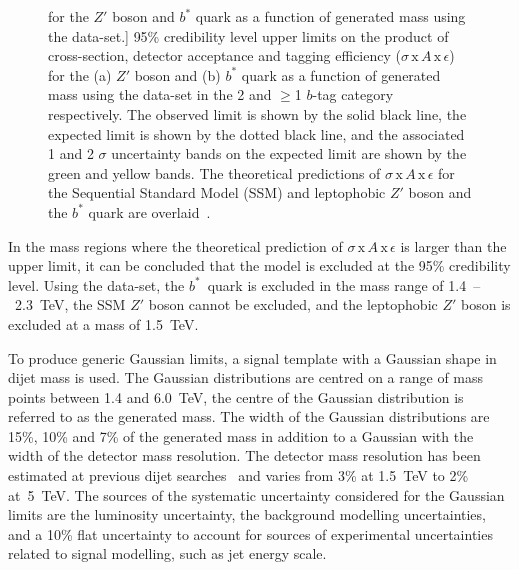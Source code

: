 \begin{figure}[!b]
        for the $Z'$ boson and $b^*$ quark as a function of generated mass
        using the \summer{} data-set.]
      {95\% credibility level upper limits on
        the product of cross-section, detector acceptance and tagging efficiency ($\sigma\,\text{x}\,\mathit{A}\,\text{x}\,\epsilon$)
        for the (a) $Z'$ boson and (b) $b^*$ quark  as a function of generated mass
        using the \summer{} data-set in the 2 and \mbox{$\geq$1} $b$-tag category respectively.
        The observed limit is shown by the solid black line,
        the expected limit is shown by the dotted black line,
        and the associated 1 and 2 $\sigma$ uncertainty bands on the expected limit are shown by the green and yellow bands.
        The theoretical predictions of $\sigma\,\text{x}\,\mathit{A}\,\text{x}\,\epsilon$
        for the Sequential Standard Model (SSM) and leptophobic $Z'$ boson and the $b^*$ quark are overlaid~\cite{dibjet-ichep_conf}.
      }
  \label{fig:lim-summer_benchmark}
\end{figure}

In the mass regions where the theoretical prediction of $\sigma\,\text{x}\,\mathit{A}\,\text{x}\,\epsilon$
is larger than the upper limit, it can be concluded that the model is excluded at the 95\% credibility level.
Using the \summer{} data-set,
the \mbox{$b^*$ quark} is excluded in the mass range of 1.4~--~2.3~TeV,
the SSM $Z'$ boson cannot be excluded,
and the leptophobic $Z'$ boson is excluded at a mass of 1.5~TeV.


\newpage 
To produce generic Gaussian limits,
a signal template with a Gaussian shape in dijet mass is used.
The Gaussian distributions are centred on a range of mass points between 1.4 and 6.0~TeV,
the centre of the  Gaussian distribution is referred to as the generated mass.
The width of the Gaussian distributions are
15\%, 10\% and 7\% of the generated mass
in addition to a Gaussian with the width of the detector mass resolution.
The detector mass resolution has been estimated
at previous dijet searches~\cite{dijet-mori16_paper}
and varies from 3\% at 1.5~TeV to 2\% at~5~TeV.
The sources of the systematic uncertainty considered for the Gaussian limits 
are the luminosity uncertainty,
the background modelling uncertainties,
and a 10\% flat uncertainty to account for sources of
experimental uncertainties related to signal modelling,
such as jet energy scale.

